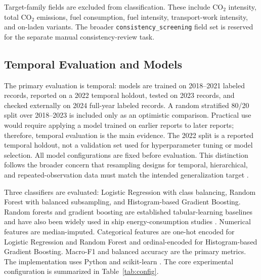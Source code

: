\documentclass[preprints,article,submit,pdftex,oneauthor]{Definitions/mdpi}
\begin{document}
Target-family fields are excluded from classification. These include CO$_2$ intensity, total CO$_2$ emissions, fuel consumption, fuel intensity, transport-work intensity, and on-laden variants. The broader \texttt{consistency\_screening} field set is reserved for the separate manual consistency-review task.

\subsection{Temporal Evaluation and Models}

The primary evaluation is temporal: models are trained on 2018--2021 labeled records, reported on a 2022 temporal holdout, tested on 2023 records, and checked externally on 2024 full-year labeled records. A random stratified 80/20 split over 2018--2023 is included only as an optimistic comparison. Practical use would require applying a model trained on earlier reports to later reports; therefore, temporal evaluation is the main evidence. The 2022 split is a reported temporal holdout, not a validation set used for hyperparameter tuning or model selection. All model configurations are fixed before evaluation. This distinction follows the broader concern that resampling designs for temporal, hierarchical, and repeated-observation data must match the intended generalization target \cite{roberts2017cross_validation_structured,bergmeir2018time_series_cv}.

Three classifiers are evaluated: Logistic Regression with class balancing, Random Forest with balanced subsampling, and Histogram-based Gradient Boosting. Random forests and gradient boosting are established tabular-learning baselines and have also been widely used in ship energy-consumption studies \cite{breiman2001random_forests,friedman2001gradient_boosting,fan2024ship_energy_ml}. Numerical features are median-imputed. Categorical features are one-hot encoded for Logistic Regression and Random Forest and ordinal-encoded for Histogram-based Gradient Boosting. Macro-F1 and balanced accuracy are the primary metrics. The implementation uses Python and scikit-learn \cite{scikit_learn}. The core experimental configuration is summarized in Table~\ref{tab:config}.
\end{document}
